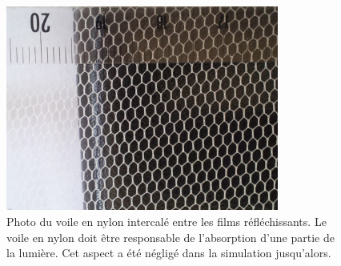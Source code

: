 {\begin{figure}[h!]

\end{figure}

\begin{figure}[h!]
\centering
\includegraphics[width=0.8\textwidth]{images/20140619_161654.jpg}
\caption[Photo du voile en nylon intercalé entre les films réfléchissants]{Photo du voile en nylon intercalé entre les films réfléchissants. Le voile en nylon doit être responsable de l'absorption d'une partie de la lumière. Cet aspect a été négligé dans la simulation jusqu'alors.}
\label{fig:20140619_161654.jpg}
\end{figure}

\clearpage

}

